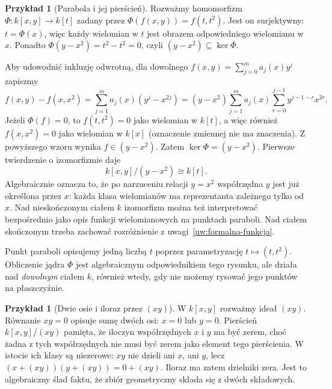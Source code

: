 \documentclass[11pt,a4paper,openany]{report}
\numberwithin{equation}{section}
\theoremstyle{plain}
\theoremstyle{definition}
\newtheorem{przyklad}[twierdzenie]{Przykład}
\theoremstyle{remark}
\newcommand{\kerf}{\operatorname{ker}}
\begin{document}
\begin{przyklad}[Parabola i jej pierścień]
\label{pr:parabola}
Rozważmy homomorfizm
$\Phi\colon k[x,y]\to k[t]$ zadany przez
$\Phi(f(x,y))=f(t,t^2)$.
Jest on surjektywny: $t=\Phi(x)$, więc każdy wielomian w $t$
jest obrazem odpowiedniego wielomianu w $x$.
Ponadto $\Phi(y-x^2)=t^2-t^2=0$, czyli
$(y-x^2)\subseteq\kerf\Phi$.

Aby udowodnić inkluzję odwrotną, dla dowolnego
$f(x,y)=\sum_{j=0}^m a_j(x)y^j$ zapiszmy
\[
 f(x,y)-f(x,x^2)
 =\sum_{j=1}^m a_j(x)(y^j-x^{2j})
 =(y-x^2)\sum_{j=1}^m a_j(x)
   \sum_{r=0}^{j-1}y^{j-1-r}x^{2r}.
\]
Jeżeli $\Phi(f)=0$, to $f(t,t^2)=0$ jako wielomian w $k[t]$,
a więc również $f(x,x^2)=0$ jako wielomian w $k[x]$
(oznaczenie zmiennej nie ma znaczenia). Z powyższego wzoru
wynika $f\in(y-x^2)$. Zatem $\kerf\Phi=(y-x^2)$.
Pierwsze twierdzenie o izomorfizmie daje
\[
 k[x,y]/(y-x^2)\cong k[t].
\]
Algebraicznie oznacza to, że po narzuceniu relacji $y=x^2$
współrzędna $y$ jest już określona przez $x$: każda klasa wielomianów
ma reprezentanta zależnego tylko od $x$.
Nad nieskończonym ciałem $k$ izomorfizm można też interpretować
bezpośrednio jako opis funkcji wielomianowych na punktach paraboli.
Nad ciałem skończonym trzeba zachować rozróżnienie z
uwagi~\ref{uw:formalna-funkcja}.
\end{przyklad}

\begin{center}
\end{center}
Punkt paraboli opisujemy jedną liczbą $t$ poprzez parametryzację
$t\mapsto(t,t^2)$. Obliczenie jądra $\Phi$ jest algebraicznym
odpowiednikiem tego rysunku, ale działa nad \emph{dowolnym} ciałem $k$,
również wtedy, gdy nie możemy rysować jego punktów na płaszczyźnie.

\begin{przyklad}[Dwie osie i iloraz przez $(xy)$]
W $k[x,y]$ rozważmy ideał $(xy)$.
Równanie $xy=0$ opisuje sumę dwóch osi: $x=0$ lub $y=0$.
Pierścień $k[x,y]/(xy)$ pamięta, że iloczyn współrzędnych $x$ i $y$
ma być zerem, choć żadna z tych współrzędnych nie musi być zerem
jako element tego pierścienia.
W istocie ich klasy są niezerowe:
$xy$ nie dzieli ani $x$, ani $y$, lecz
$(x+(xy))(y+(xy))=0+(xy)$.
Iloraz ma zatem dzielniki zera. Jest to algebraiczny ślad faktu,
że zbiór geometryczny składa się z dwóch składowych.
\end{przyklad}
\end{document}
